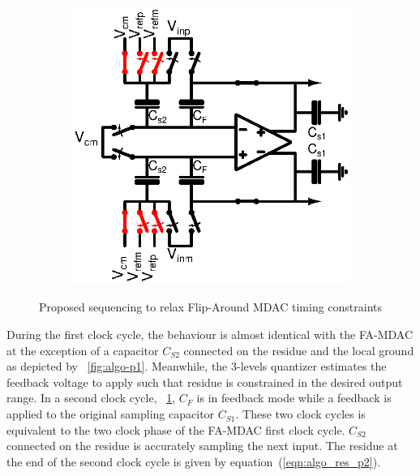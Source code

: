 \begin{figure}[htp]
\begin{subfigure}[b]{0.32\textwidth}
		\label{fig:algo-p2}
	\end{subfigure}
	\begin{subfigure}[b]{0.32\textwidth}
		\centering
		\includegraphics[width=\textwidth]{Chapter4/Figs/algorithmic-mdac-p3.ps}
		\label{fig:algo-p3}
	\end{subfigure}
	\caption{Proposed sequencing to relax Flip-Around MDAC timing constraints}
	\label{fig:algo-seq-proposed}
\end{figure}

During the first clock cycle, the behaviour is almost identical with the FA-MDAC at the exception of a capacitor \(C_{S2}\) connected on the residue and the local ground as depicted by \figurename~\ref{fig:algo-p1}. Meanwhile, the 3-levels quantizer estimates the feedback voltage to apply such that residue is constrained in the desired output range. In a second clock cycle, \figurename~\ref{fig:algo-p2}, \(C_F\) is in feedback mode while a feedback is applied to the original sampling capacitor \(C_{S1}\). These two clock cycles is equivalent to the two clock phase of the FA-MDAC first clock cycle. \(C_{S2}\) connected on the residue is accurately sampling the next input. The residue at the end of the second clock cycle is given by equation~(\ref{eqn:algo_res_p2}).

